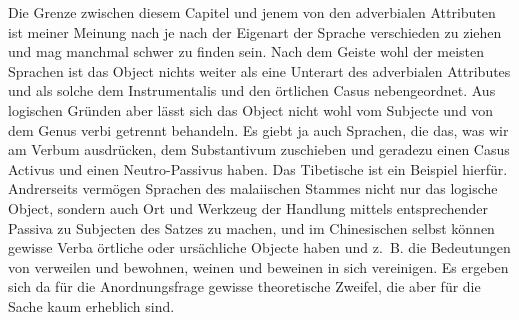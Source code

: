 Die Grenze zwischen diesem Capitel und jenem von den adverbialen Attributen ist meiner Meinung nach je nach der Eigenart der Sprache verschieden zu ziehen und mag manchmal schwer zu finden sein. Nach dem Geiste wohl der meisten Sprachen ist das Object nichts weiter als eine Unterart des adverbialen Attributes und als solche dem Instrumentalis und den örtlichen Casus nebengeordnet. Aus logischen Gründen aber lässt sich das Object nicht wohl vom Subjecte und von dem Genus verbi getrennt behandeln. Es giebt ja auch Sprachen, die das, was wir am Verbum ausdrücken, dem Substantivum zuschieben und geradezu einen Casus Activus und einen Neutro-Passivus haben. Das Tibetische ist ein Beispiel hierfür.  Andrerseits vermögen Sprachen des malaiischen Stammes nicht nur das logische Object, sondern auch Ort und Werkzeug der Handlung mittels entsprechender Passiva zu Subjecten des Satzes zu machen, und im Chinesischen selbst können gewisse Verba örtliche oder ursächliche Objecte haben und z.~B. die Bedeutungen von verweilen und bewohnen, weinen und beweinen in sich vereinigen. Es ergeben sich da für die Anordnungsfrage gewisse theoretische Zweifel, die aber für die Sache kaum erheblich sind.

